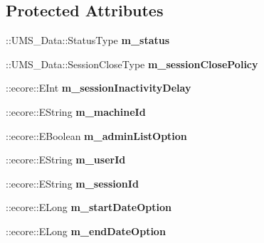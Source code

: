 \subsection*{Protected Attributes}
\begin{DoxyCompactItemize}
\item 
\hypertarget{classUMS__Data_1_1ListSessionOptions_a3f6e69f33a3c997bbd7e9835f9e3e2cf}{
::UMS\_\-Data::StatusType {\bfseries m\_\-status}}
\label{classUMS__Data_1_1ListSessionOptions_a3f6e69f33a3c997bbd7e9835f9e3e2cf}

\item 
\hypertarget{classUMS__Data_1_1ListSessionOptions_a32f0993363a247b2e8584e410ca8fb64}{
::UMS\_\-Data::SessionCloseType {\bfseries m\_\-sessionClosePolicy}}
\label{classUMS__Data_1_1ListSessionOptions_a32f0993363a247b2e8584e410ca8fb64}

\item 
\hypertarget{classUMS__Data_1_1ListSessionOptions_a321a312dd771a1b4207fa73d8078a330}{
::ecore::EInt {\bfseries m\_\-sessionInactivityDelay}}
\label{classUMS__Data_1_1ListSessionOptions_a321a312dd771a1b4207fa73d8078a330}

\item 
\hypertarget{classUMS__Data_1_1ListSessionOptions_ae8a51f8388a3ad8cba4df1ee9248da57}{
::ecore::EString {\bfseries m\_\-machineId}}
\label{classUMS__Data_1_1ListSessionOptions_ae8a51f8388a3ad8cba4df1ee9248da57}

\item 
\hypertarget{classUMS__Data_1_1ListSessionOptions_a839b093e487afd44b716cf4dfc31408b}{
::ecore::EBoolean {\bfseries m\_\-adminListOption}}
\label{classUMS__Data_1_1ListSessionOptions_a839b093e487afd44b716cf4dfc31408b}

\item 
\hypertarget{classUMS__Data_1_1ListSessionOptions_a5810b33cac32518399f02200e0423c3b}{
::ecore::EString {\bfseries m\_\-userId}}
\label{classUMS__Data_1_1ListSessionOptions_a5810b33cac32518399f02200e0423c3b}

\item 
\hypertarget{classUMS__Data_1_1ListSessionOptions_a56381dc431f5630c0d2e5bfa59de6a41}{
::ecore::EString {\bfseries m\_\-sessionId}}
\label{classUMS__Data_1_1ListSessionOptions_a56381dc431f5630c0d2e5bfa59de6a41}

\item 
\hypertarget{classUMS__Data_1_1ListSessionOptions_aeb3a2656e3e3394cd8c8718908522e13}{
::ecore::ELong {\bfseries m\_\-startDateOption}}
\label{classUMS__Data_1_1ListSessionOptions_aeb3a2656e3e3394cd8c8718908522e13}

\item 
\hypertarget{classUMS__Data_1_1ListSessionOptions_a9a461ee5441c60d779c4ecb0d905cf21}{
::ecore::ELong {\bfseries m\_\-endDateOption}}
\label{classUMS__Data_1_1ListSessionOptions_a9a461ee5441c60d779c4ecb0d905cf21}

\end{DoxyCompactItemize}


